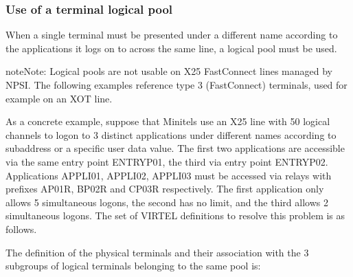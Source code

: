 \documentclass[letterpaper,10pt,english]{sphinxmanual}
\begin{document}
\subsubsection{Use of a terminal logical pool}
\label{\detokenize{connectivity_guide:use-of-a-terminal-logical-pool}}
\sphinxAtStartPar
When a single terminal must be presented under a different name according to the applications it logs on to across the same line, a logical pool must be used.

\begin{sphinxadmonition}{note}{Note:}
\sphinxAtStartPar
Logical pools are not usable on X25 Fast\sphinxhyphen{}Connect lines managed by NPSI. The following examples reference type 3 (Fast\sphinxhyphen{}Connect) terminals, used for example on an XOT line.
\end{sphinxadmonition}

\sphinxAtStartPar
As a concrete example, suppose that Minitels use an X25 line with 50 logical channels to logon to 3 distinct applications under different names according to sub\sphinxhyphen{}address or a specific user data value. The first two applications are accessible via the same entry point ENTRYP01, the third via entry point ENTRYP02. Applications APPLI01, APPLI02, APPLI03 must be accessed via relays with prefixes AP01R, BP02R and CP03R respectively. The first application only allows 5 simultaneous logons, the second has no limit, and the third allows 2 simultaneous logons. The set of VIRTEL definitions to resolve this problem is as follows.

\sphinxAtStartPar
{}

\sphinxAtStartPar
The definition of the physical terminals and their association with the 3 sub\sphinxhyphen{}groups of logical terminals belonging to the same pool is:

\begin{sphinxVerbatim}[commandchars=\\\{\}]
   
                    

                     

      
                    

                     
                     
                     
\end{sphinxVerbatim}
\end{document}
